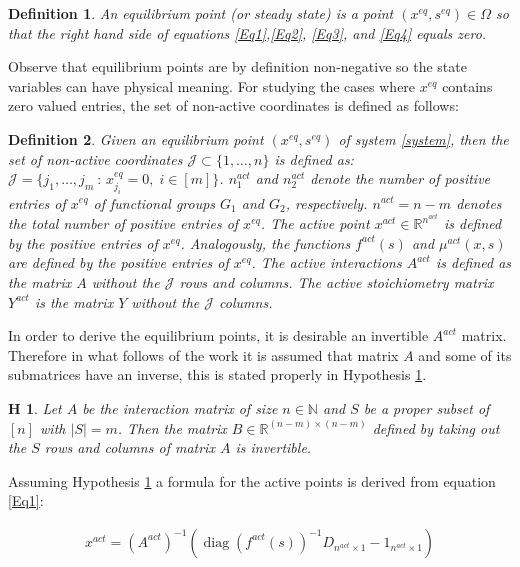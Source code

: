 \documentclass[3p,times]{article}
\newcommand{\N}{\mathbb{N}}
\newcommand{\R}{\mathbb{R}}
\DeclareMathOperator{\diag}{diag}
\newtheorem{defn}{Definition}
\newtheorem{hypo}{H}
\begin{document}
\begin{defn} 
	An equilibrium point (or steady state) is a point $(x^{eq},s^{eq}) \in \Omega$ so that the right hand side of equations \eqref{Eq1},\eqref{Eq2}, \eqref{Eq3}, and \eqref{Eq4} equals zero. 
\end{defn} 

Observe that equilibrium points are by definition non-negative so the state variables can have physical meaning. For studying the cases where $x^{eq}$ contains zero valued entries, the set of non-active coordinates is defined as follows:

\begin{defn}
	Given an equilibrium point $(x^{eq},s^{eq})$ of system \eqref{system}, then the set of non-active coordinates $\mathcal{J}\subset \{1,\dots,n\}$ is defined as:
	$\mathcal{J} = \{j_1, \dots, j_m\ : \, x^{eq}_{j_i} = 0 , \;i \in [m] \} $. $n_1^{act}$ and $n_2^{act}$ denote the number of positive entries of $x^{eq}$ of functional groups $G_1$ and $G_2$, respectively. $n^{act} = n-m$ denotes the total number of positive entries of $x^{eq}$. The active point $x^{act}\in \R^{n^{act}}$ is defined by the positive entries of $x^{eq}$. Analogously, the functions $f^{act}(s)$ and $\mu^{act}(x,s)$ are defined by the positive entries of $x^{eq}$. The active interactions $A^{act}$ is defined as the matrix $A$ without the $\mathcal{J}$ rows and columns. The active stoichiometry matrix $Y^{act}$ is the matrix $Y$ without the $\mathcal{J}$ columns. 
\end{defn}
 
 In order to derive the equilibrium points, it is desirable an invertible $A^{act}$ matrix. Therefore in what follows of the work it is assumed that matrix $A$ and some of its submatrices have an inverse, this is stated properly in Hypothesis \ref{inverse hypothesis}. 

\begin{hypo}
	Let $A$ be the interaction matrix of size $n \in \N$ and $S$ be a proper subset of $[n]$ with $|S| = m$. Then the matrix $B \in \R^{(n-m) \times (n-m)}$ defined by taking out the $S$ rows and columns of matrix $A$ is invertible.
	\label{inverse hypothesis}
\end{hypo} 

Assuming Hypothesis \ref{inverse hypothesis} a formula for the active points is derived from equation \eqref{Eq1}:

\begin{align}
\label{EqSome}x^{act} = (A^{act})^{-1}(\diag(f^{act}(s))^{-1}D_{n^{act}\times 1} - 1_{n^{act}\times 1})
\end{align} 
\end{document}
